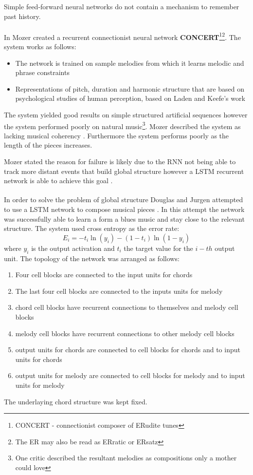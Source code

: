 Simple feed-forward neural networks do not contain a mechanism to remember past history.  
\\
\\
In \cite{mozer1994neural} Mozer created a recurrent connectionist neural network \textbf{CONCERT}\footnote{CONCERT - connectionist composer of ERudite tunes}\footnote{The ER may also be read as ERratic or ERsatz}.
The system works as follows:
\begin{itemize}
\item The network is trained on sample melodies from which it learns melodic and phrase constraints
\item Representations of pitch, duration and harmonic structure that are based on psychological studies of human perception, based on Laden and Keefe's work \cite{laden1989representation}
\end{itemize}
The system yielded good results on simple structured artificial sequences however the system performed poorly on natural music\footnote{One critic described the resultant melodies as compositions only a mother could love}. Mozer described the system as lacking musical coherency \cite{mozer1994neural}. Furthermore the system performs poorly as the length of the pieces increases.

Mozer stated the reason for failure is likely due to the \ac{RNN} not being able to track more distant events that build global structure \cite{mozer1994neural} however a \ac{LSTM} recurrent network is able to achieve this goal \cite{Eck2002}.
\\
\\
In order to solve the problem of global structure Douglas and Jurgen attempted to use a \ac{LSTM} network to compose musical pieces \cite{Eck2002}. In this attempt the network was successfully able to learn a form a blues music and stay close to the relevant structure.
The system used cross entropy as the error rate:
\[
E_i = -t_i \ln(y_i) - (1-t_i)\ln (1-y_i) \]
where $y_i$ is the output activation and $t_i$ the target value for the $i-th$ output unit.
The topology of the network was arranged as follows:
\begin{enumerate}
\item Four cell blocks are connected to the input units for chords
\item The last four cell blocks are connected to the inputs units for melody
\item chord cell blocks have recurrent connections to themselves and melody cell blocks
\item melody cell blocks have recurrent connections to other melody cell blocks
\item output units for chords are connected to cell blocks for chords and to input units for chords
\item output units for melody are connected to cell blocks for melody and to input units for melody
\end{enumerate}
The underlaying chord structure was kept fixed.

